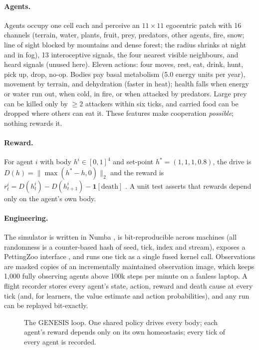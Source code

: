 \documentclass[10pt]{article}
\begin{document}
\paragraph{Agents.} Agents occupy one cell each and perceive an $11{\times}11$ egocentric patch with 16 channels
(terrain, water, plants, fruit, prey, predators, other agents, fire, snow; line of sight blocked by mountains and dense
forest; the radius shrinks at night and in fog), 13 interoceptive signals, the four nearest visible neighbours, and
heard signals (unused here). Eleven actions: four moves, rest, eat, drink, hunt, pick up, drop, no-op. Bodies pay basal
metabolism (5.0 energy units per year), movement by terrain, and dehydration (faster in heat); health falls when
energy or water run out, when cold, in fire, or when attacked by predators. Large prey can be killed only by
${\geq}2$ attackers within six ticks, and carried food can be dropped where others can eat it. These features make
cooperation \emph{possible}; nothing rewards it.

\paragraph{Reward.} For agent $i$ with body $h^i\in[0,1]^4$ and set-point $h^*=(1,1,1,0.8)$, the drive is
$D(h)=\lVert\max(h^*-h,0)\rVert_2$ and the reward is $r^i_t = D(h^i_t)-D(h^i_{t+1})-\mathbf{1}[\text{death}]$
\citep{keramati2014homeostatic}. A unit test asserts that rewards depend only on the agent's own body.

\paragraph{Engineering.} The simulator is written in Numba \citep{lam2015numba}, is bit-reproducible across machines
(all randomness is a counter-based hash of seed, tick, index and stream), exposes a PettingZoo interface
\citep{terry2021pettingzoo}, and runs one tick as a single fused kernel call. Observations are masked copies of an
incrementally maintained observation image, which keeps 1{,}000 fully observing agents above 100k steps per minute on
a fanless laptop. A flight recorder stores every agent's state, action, reward and death cause at every tick (and,
for learners, the value estimate and action probabilities), and any run can be replayed bit-exactly.

\begin{figure}[t]
  \centering
  \resizebox{\linewidth}{!}{\systemdiagram}
  \caption{The GENESIS loop. One shared policy drives every body; each agent's reward depends only on its own
  homeostasis; every tick of every agent is recorded.}
  \label{fig:system}
\end{figure}
\end{document}
